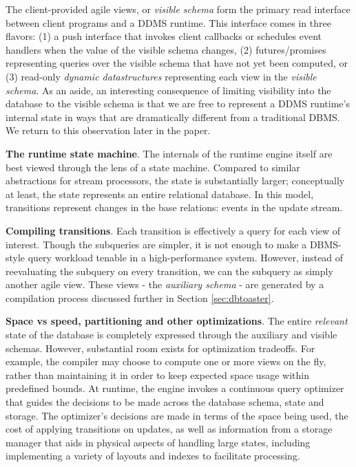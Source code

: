 The client-provided agile views, or \textit{visible schema} form the primary read interface between client programs and a DDMS runtime.  This interface comes in three flavors: (1) a push interface that invokes client callbacks or schedules event handlers when the value of the visible schema changes, (2) futures/promises representing queries over the visible schema that have not yet been computed, or (3) read-only \textit{dynamic datastructures} representing each view in the \textit{visible schema}.  As an aside, an interesting consequence of limiting visibility into the database to the visible schema is that we are free to represent a DDMS runtime's internal state in ways that are dramatically different from a traditional DBMS.  We return to this observation later in the paper.

{\bf The runtime state machine}\/.
The internals of the runtime engine itself are best viewed through the lens of a state machine.  Compared to similar abstractions for stream processors\cite{demers-sigmod:07}, the state is substantially larger; conceptually at least, the state represents an entire relational database.  In this model, transitions represent changes in the base relations: events in the update stream.

{\bf Compiling transitions}\/.
Each transition is effectively a query for each view of interest.  Though the subqueries are simpler, it is not enough to make a DBMS-style query workload tenable in a high-performance system.  However, instead of reevaluating the subquery on every transition, we can the subquery as simply another agile view.  These views - the \textit{auxiliary schema} - are generated by a compilation process discussed further in Section \ref{sec:dbtoaster}.  

{\bf Space vs speed, partitioning and other optimizations}\/.
The entire \textit{relevant} state of the database is completely expressed through the auxiliary and visible schemas.  However, substantial room exists for optimization tradeoffs.  For example, the compiler may choose to compute one or more views on the fly, rather than maintaining it in order to keep expected space usage within predefined bounds.  At runtime, the engine invokes a continuous query optimizer that guides the decisions to be made across the database schema, state and storage.  The optimizer's decisions are made in terms of the space being used, the cost of applying transitions on updates, as well as information from a storage manager that aids in physical aspects of handling large states, including implementing a variety of layouts and indexes to facilitate processing.
